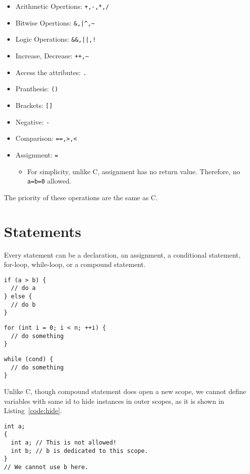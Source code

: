 \documentclass{article}
\begin{document}
\begin{itemize}
  \item Arithmetic Opertions: \texttt{+,-,*,/}
  \item Bitwise Opertions: \verb|&,|\texttt{|}\verb|^,~|
  \item Logic Operations: \verb|&&,|\texttt{||}\verb|,!|
  \item Increase, Decrease: \texttt{++,--}
  \item Access the attributes: \texttt{.}
  \item Pranthesis: \texttt{()}
  \item Brackets: \texttt{[]}
  \item Negative: \texttt{-}
  \item Comparison: \verb|==,>,<|
  \item Assignment: \texttt{=}
    \begin{itemize}
      \item For simplicity, unlike C, assignment has no return value.
	Therefore, no \texttt{a=b=0} allowed.
    \end{itemize}
\end{itemize}

The priority of these operations are the same as C.

\section{Statements}

Every statement can be a declaration, an assignment,
a conditional statement, for-loop,
while-loop, or a compound statement.

\begin{lstlisting}[caption=Conditional statement]
if (a > b) {
  // do a
} else {
  // do b
}
\end{lstlisting}

\begin{lstlisting}[caption=For loop]
for (int i = 0; i < n; ++i) {
  // do something
}
\end{lstlisting}

\begin{lstlisting}[caption=While loop]
while (cond) {
  // do something
}
\end{lstlisting}


Unlike C, though compound statement does open a new scope,
we cannot define variables with same id to hide instances in outer scopes,
as it is shown in Listing~\ref{code:hide}.
\begin{lstlisting}[caption=While loop]
int a;
{
  int a; // This is not allowed!
  int b; // b is dedicated to this scope.
}
// We cannot use b here.
\end{lstlisting}
\end{document}
